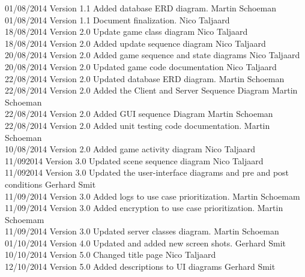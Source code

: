 \documentclass[letterpaper]{article}
\begin{document}
\begin{tabbing}
			01/08/2014  \> Version 1.1  \> Added database ERD diagram.					\> Martin Schoeman\\
			01/08/2014  \> Version 1.1  \> Document finalization.						\> Nico Taljaard\\
			18/08/2014  \> Version 2.0  \> Update game class diagram					\> Nico Taljaard\\
			18/08/2014  \> Version 2.0  \> Added update sequence diagram				\> Nico Taljaard\\
			20/08/2014  \> Version 2.0  \> Added game sequence and state diagrams		\> Nico Taljaard\\
			20/08/2014  \> Version 2.0  \> Updated game code documentation				\> Nico Taljaard\\
			22/08/2014  \> Version 2.0  \> Updated database ERD diagram.				\> Martin Schoeman\\
			22/08/2014  \> Version 2.0  \> Added the Client and Server Sequence Diagram	\> Martin Schoeman\\
			22/08/2014  \> Version 2.0  \> Added GUI sequence Diagram					\> Martin Schoeman\\
			22/08/2014  \> Version 2.0  \> Added unit testing code documentation.		\> Martin Schoeman\\
			10/08/2014	\> Version 2.0	\> Added game activity diagram					\> Nico Taljaard\\
			11/092014	\> Version 3.0	\> Updated scene sequence diagram				\> Nico Taljaard\\
			11/092014	\> Version 3.0	\> Updated the user-interface diagrams and pre and post conditions			\> Gerhard Smit\\
			11/09/2014	\> Version 3.0  \> Added logs to use case prioritization.		\> Martin Schoemam\\
			11/09/2014	\> Version 3.0  \> Added encryption to use case prioritization.	\> Martin Schoemam\\
			11/09/2014	\> Version 3.0	\> Updated server classes diagram.				\> Martin Schoeman\\
			01/10/2014  \> Version 4.0	\> Updated and added new screen shots.			\> Gerhard Smit \\
			10/10/2014	\> Version 5.0	\> Changed title page							\> Nico Taljaard\\
			12/10/2014	\> Version 5.0	\> Added descriptions to UI diagrams				\> Gerhard Smit \\
			
		\end{tabbing}
		
\end{document}
